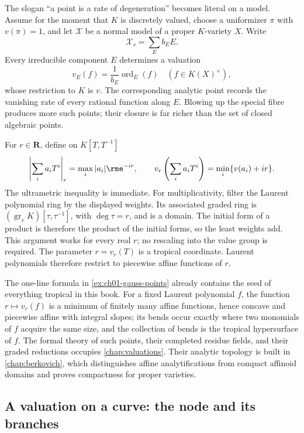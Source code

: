The slogan ``a point is a rate of degeneration'' becomes literal on a model.
Assume for the moment that $K$ is discretely valued, choose a uniformizer
$\pi$ with $v(\pi)=1$, and let $\mathcal X$ be a normal model of a proper
$K$-variety $X$.  Write
\[
                    \mathcal X_s=\sum_E b_EE.
\]
Every irreducible component $E$ determines a valuation
\[
                  v_E(f)=\frac{1}{b_E}\operatorname{ord}_E(f)
                  \quad(f\in K(X)^\times),
\]
whose restriction to $K$ is $v$.  The corresponding analytic point records
the vanishing rate of every rational function along $E$.  Blowing up the
special fibre produces more such points; their closure is far richer than
the set of closed algebraic points.

\begin{example}
\label{ex:ch01-gauss-points}
For $r\in\mathbf R$, define on $K[T,T^{-1}]$
\[
 \left|\sum_i a_iT^i\right|_r=\max_i |a_i|\rme^{-ir},
 \qquad
 v_r\left(\sum_i a_iT^i\right)=\min_i\{v(a_i)+ir\}.
\]
The ultrametric inequality is immediate.  For multiplicativity, filter the
Laurent polynomial ring by the displayed weights.  Its associated graded
ring is
$(\operatorname{gr}_vK)[\tau,\tau^{-1}]$, with
$\deg\tau=r$, and is a domain.  The initial form of a product is therefore
the product of the initial forms, so the least weights add.  This argument
works for every real $r$; no rescaling into the value group is required.
The parameter
$r=v_r(T)$ is a tropical coordinate.  Laurent polynomials therefore restrict
to piecewise affine functions of $r$.
\end{example}

The one-line formula in \cref{ex:ch01-gauss-points} already contains the
seed of everything tropical in this book.  For a fixed Laurent polynomial
$f$, the function $r\mapsto v_r(f)$ is a minimum of finitely many affine
functions, hence concave and piecewise affine with integral slopes; its
bends occur exactly where two monomials of $f$ acquire the same size, and
the collection of bends is the tropical hypersurface of $f$.  The formal
theory of such points, their completed residue fields, and their graded
reductions occupies \cref{chap:valuations}.  Their analytic topology is
built in \cref{chap:berkovich}, which distinguishes affine analytifications
from compact affinoid domains and proves compactness for proper varieties.

\subsection{A valuation on a curve: the node and its branches}
\label{sec:ch01-node-branches}

